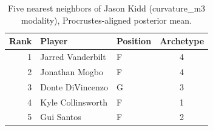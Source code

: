 \begin{table}[htbp]
  \centering\small
  \begin{tabular}{rllc}
    \toprule
    Rank & Player & Position & Archetype \\
    \midrule
    1 & Jarred Vanderbilt & F & 4 \\
    2 & Jonathan Mogbo & F & 4 \\
    3 & Donte DiVincenzo & G & 3 \\
    4 & Kyle Collinsworth & F & 1 \\
    5 & Gui Santos & F & 2 \\
    \bottomrule
  \end{tabular}
  \caption{Five nearest neighbors of Jason Kidd (curvature_m3 modality), Procrustes-aligned posterior mean.}
  \label{tab:Jason_Kidd_neighbors_curvature_m3}
\end{table}

